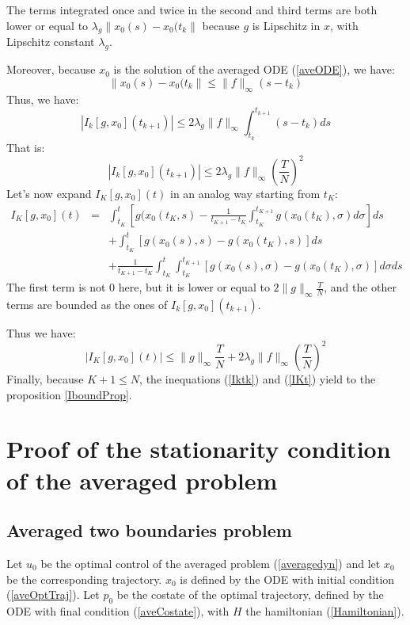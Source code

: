 \documentclass[a4paper,10pt]{article}
\begin{document}
The terms integrated once and twice 
in the second and third terms are both lower or equal to
$\lambda_{g}\|x_{0}(s)-x_{0}(t_{k}\|$ because $g$ is Lipschitz in 
$x$, with Lipschitz constant $\lambda_{g}$.

Moreover, because  $x_{0}$ is 
the solution of the averaged ODE (\ref{aveODE}), we have: 
\[
  \|x_{0}(s)-x_{0}(t_{k}\| \le \|f\|_{\infty}(s-t_{k})  
\]
Thus, we have:
\[
    |I_{k}[g,x_{0}](t_{k+1})| \le 2 \lambda_{g} \|f\|_{\infty}
    \int_{t_{k}}^{t_{k+1}} (s-t_{k}) ds
\]
That is:
\begin{equation}
        |I_{k}[g,x_{0}](t_{k+1})| \le 2 \lambda_{g} \|f\|_{\infty}
	\left(\frac{T}{N}\right)^{2}
    \label{Iktk}
\end{equation}
Let's now expand $I_{K}[g,x_{0}](t)$ in an analog way starting from 
$t_{K}$:
\begin{eqnarray*}
    I_{K}[g,x_{0}](t) & = &
    \int_{t_{K}}^{t}  \left[ g(x_{0}(t_{K},s) 
    - \frac{1}{t_{K+1}-t_{K}} \int_{t_{K}}^{t_{K+1}} 
    g(x_{0}(t_{K}), \sigma ) d \sigma \right] ds 
      \\ & &
    +\int_{t_{K}}^{t} [g(x_{0}(s),s) -  g(x_{0}(t_{K}),s)] ds 
     \\ & &
    + \frac{1}{t_{K+1}-t_{K}} \int_{t_{K}}^{t} \int_{t_{K}}^{t_{K+1}}
    [g(x_{0}(s),\sigma) 
    - g(x_{0}(t_{K}),\sigma)] d \sigma ds
\end{eqnarray*}
The first term is not $0$ here, but it is lower or equal to $2 
\|g\|_{\infty}\frac{T}{N}$, and the other terms are bounded as the 
ones of $I_{k}[g,x_{0}](t_{k+1})$.

Thus we have:
\begin{equation}
        |I_{K}[g,x_{0}](t)| \le \|g\|_{\infty}\frac{T}{N} 
	+ 2 \lambda_{g} \|f\|_{\infty}\left(\frac{T}{N}\right)^{2}
    \label{IKt}
\end{equation}
Finally, because $K+1 \le N$, the inequations (\ref{Iktk}) and (\ref{IKt}) yield to the 
proposition \ref{IboundProp}.


\section{Proof of the stationarity condition of the averaged 
problem}\label{proofStationarity}
\subsection{Averaged two boundaries problem}
Let $u_{0}$ be the optimal control of the averaged problem 
(\ref{averagedyn}) and let $x_{0}$ be the corresponding trajectory.
$x_{0}$ is defined by the ODE with initial condition 
(\ref{aveOptTraj}).
Let $p_{0}$ be the costate of the optimal trajectory, defined by the 
ODE with final condition (\ref{aveCostate}), with $H$ the hamiltonian 
(\ref{Hamiltonian}).
\end{document}
